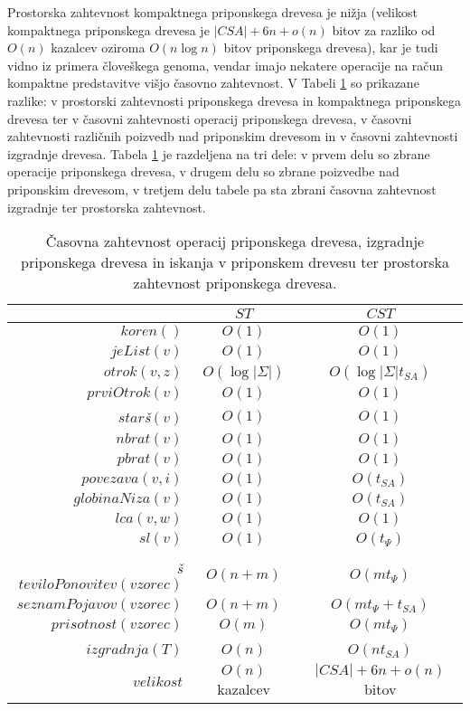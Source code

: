 Prostorska zahtevnost kompaktnega priponskega drevesa je nižja (velikost kompaktnega priponskega drevesa je $|CSA|+6n+o(n)$ bitov za razliko od $O(n)$ kazalcev oziroma $O(n\log{n})$ bitov priponskega drevesa), kar je tudi vidno iz primera človeškega genoma, vendar imajo nekatere operacije na račun kompaktne predstavitve višjo časovno zahtevnost. V Tabeli \ref{tab:PrimerjaST} so prikazane razlike: v prostorski zahtevnosti priponskega drevesa in kompaktnega priponskega drevesa ter  v časovni zahtevnosti operacij priponskega drevesa, v časovni zahtevnosti različnih poizvedb nad priponskim drevesom in v časovni zahtevnosti izgradnje drevesa. Tabela \ref{tab:PrimerjaST} je razdeljena na tri dele: v prvem delu so zbrane operacije priponskega drevesa, v drugem delu so zbrane poizvedbe nad priponskim drevesom, v tretjem delu tabele pa sta zbrani časovna zahtevnost izgradnje ter prostorska zahtevnost.

\begin{table}[htb]
    \centering
    \caption{Časovna zahtevnost operacij priponskega drevesa, izgradnje priponskega drevesa in iskanja v priponskem drevesu ter prostorska zahtevnost priponskega drevesa.}
    \begin{tabular}{rcc}
         &$ST$& $CST$\\\hline
        $koren()$& $O(1)$ & $O(1)$ \\
        $jeList(v)$& $O(1)$ & $O(1)$\\
        $otrok(v,z)$& $O(\log|\Sigma|)$& $O(\log|\Sigma|t_{SA})$\\
        $prviOtrok(v)$& $O(1)$&$O(1)$\\
        $star$\textit{š}$(v)$& $O(1)$& $O(1)$\\
        $nbrat(v)$& $O(1)$& $O(1)$\\
        $pbrat(v)$& $O(1)$& $O(1)$\\
       
        $povezava(v,i)$& $O(1)$ & $O(t_{SA})$\\
        $globinaNiza(v)$& $O(1)$ & $O(t_{SA})$ \\
        $lca(v,w)$& $O(1)$& $O(1)$\\
        $sl(v)$& $O(1)$& $O(t_\Psi)$ \\
        \\
        \textit{š}$teviloPonovitev(vzorec)$& $O(n+m)$& $O(mt_{\Psi})$\\
        $seznamPojavov(vzorec)$& $O(n+m)$ & $O(mt_\Psi + t_{SA})$\\
        $prisotnost(vzorec)$& $O(m)$& $O(mt_{\Psi})$\\
        \\
        $izgradnja(T)$& $O(n)$ & $O(nt_{SA})$\\
        $velikost$& $O(n)$ kazalcev & $|CSA|+6n+o(n)$ bitov\\
    \end{tabular} 
    \label{tab:PrimerjaST}
\end{table}

